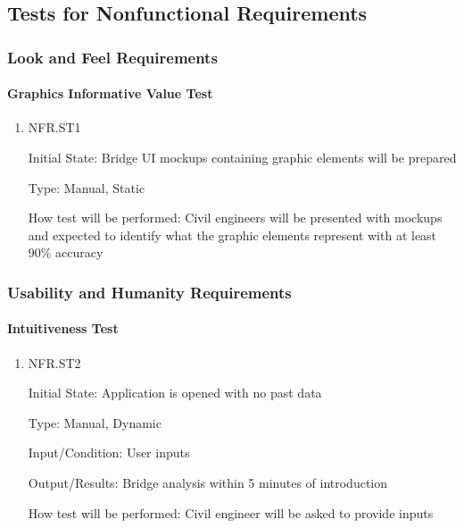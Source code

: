 \documentclass[12pt, titlepage]{article}
\begin{document}
\subsection{Tests for Nonfunctional Requirements}



\subsubsection{Look and Feel Requirements}
		
\paragraph{Graphics Informative Value Test}

\begin{enumerate}

\item{NFR.ST1\\}

Initial State: Bridge UI mockups containing graphic elements will be prepared

Type: Manual, Static

How test will be performed: Civil engineers will be presented with mockups and expected to identify what the graphic elements represent with at least 90\% accuracy

\end{enumerate}

\subsubsection{Usability and Humanity Requirements}
		
\paragraph{Intuitiveness Test}

\begin{enumerate}

\item{NFR.ST2\\}

Initial State: Application is opened with no past data

Type: Manual, Dynamic

Input/Condition: User inputs

Output/Results: Bridge analysis within 5 minutes of introduction

How test will be performed: Civil engineer will be asked to provide inputs

\end{enumerate}
		
\end{document}
